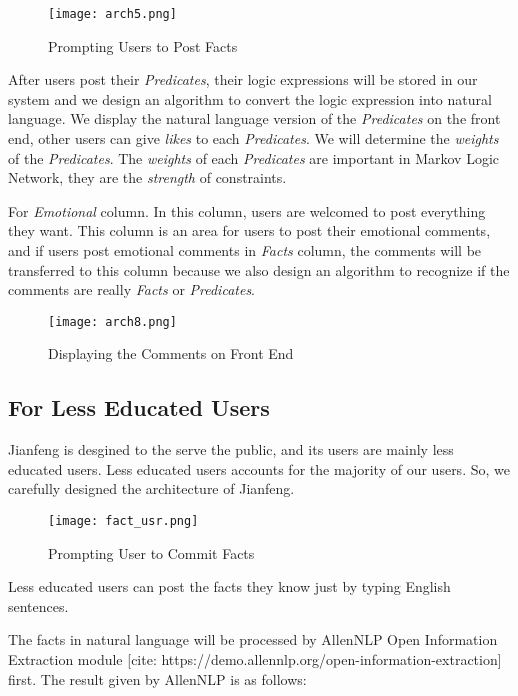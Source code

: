 \documentclass[
12pt, %
a4paper, %
oneside, %
headinclude,footinclude, %
BCOR5mm, %
]{scrartcl}
\begin{document}
\begin{figure}[htb]
    \centering 
    \texttt{[image: arch5.png]} 
    \caption[Prompting Users to Post facts]{Prompting Users to Post Facts} 
    \end{figure}
    
After users post their \textit{Predicates}, their logic expressions will be stored in our system and we design an algorithm to convert the logic expression into natural language. We display the natural language version of the \textit{Predicates} on the front end, other users can give \textit{likes} to each \textit{Predicates}. We will determine the \textit{weights} of the \textit{Predicates}. The \textit{weights} of each \textit{Predicates} are important in Markov Logic Network, they are the \textit{strength} of constraints.

For \textit{Emotional} column. In this column, users are welcomed to post everything they want. This column is an area for users to post their emotional comments, and if users post emotional comments in \textit{Facts} column, the comments will be transferred to this column because we also design an algorithm to recognize if the comments are really \textit{Facts} or \textit{Predicates}. 


\begin{figure}[htb]
    \centering 
    \texttt{[image: arch8.png]} 
    \caption[Displaying the Comments on Front End]{Displaying the Comments on Front End} 
    \end{figure}



\subsection{For Less Educated Users}


Jianfeng is desgined to the serve the public, and its users are mainly less educated users. Less educated users accounts for the majority of our users. So, we carefully designed the architecture of Jianfeng. 

\begin{figure}[htb]
    \centering 
    \texttt{[image: fact\_usr.png]} 
    \caption[Prompting User to Commit Facts]{Prompting User to Commit Facts} 
    \end{figure}

Less educated users can post the facts they know just by typing English sentences. 


The facts in natural language will be processed by AllenNLP Open Information Extraction module [cite: https://demo.allennlp.org/open-information-extraction] first. The result given by AllenNLP is as follows:
\end{document}
